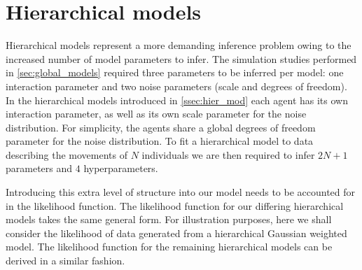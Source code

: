 \section{Hierarchical models}
\label{sec:hier_mod_studies}

Hierarchical models represent a more demanding inference problem owing to the
increased number of model parameters to infer. The simulation studies performed
in \cref{sec:global_models} required three parameters to be inferred per model:
one interaction parameter and two noise parameters (scale and degrees of
freedom). In the hierarchical models introduced in \cref{ssec:hier_mod} each
agent has its own interaction parameter, as well as its own scale parameter for
the noise distribution. For simplicity, the agents share a global degrees of
freedom parameter for the noise distribution. To fit a hierarchical model to
data describing the movements of $N$ individuals we are then required to infer
$2N+1$ parameters and $4$ hyperparameters.

Introducing this extra level of structure into our model needs to be accounted
for in the likelihood function. The likelihood function for our differing
hierarchical models takes the same general form. For illustration purposes,
here we shall consider the likelihood of data generated from a hierarchical
Gaussian weighted model. The likelihood function for the remaining hierarchical
models can be derived in a similar fashion.

